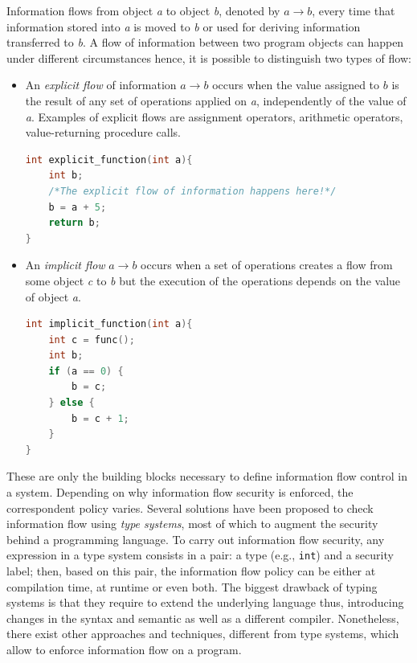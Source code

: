 \documentclass[LaM,binding=0.6cm]{sapthesis}
\begin{document}
Information flows from object \textit{a} to object \textit{b}, denoted by $a \rightarrow b$, every time that information stored into \textit{a} is moved to \textit{b} or used for deriving information transferred to \textit{b}. A flow of information between two program objects can happen under different circumstances hence, it is possible to distinguish two types of flow:
\begin{itemize}
\item An \textit{explicit flow} of information $a \rightarrow b$ occurs when the value assigned to $b$ is the result of any set of operations applied on \textit{a}, independently of the value of \textit{a}. Examples of explicit flows are assignment operators, arithmetic operators, value-returning procedure calls.
\begin{lstlisting}[language=C++, caption=Example of explicit flow where the value of variable \texttt{b} is the result of an addition operation involving variable \texttt{a}.]
int explicit_function(int a){
	int b;
	/*The explicit flow of information happens here!*/
	b = a + 5;
	return b;
}
\end{lstlisting}
\item An \textit{implicit flow} $a \rightarrow b$ occurs when a set of operations creates a flow from some object \textit{c} to \textit{b} but the execution of the operations depends on the value of object \textit{a}.
\begin{lstlisting}[language=C++, caption=Example of implicit flow where the value assumed by variable \texttt{b} depends on the actual value of variable \texttt{a}.]
int implicit_function(int a){
	int c = func();
	int b;
	if (a == 0) {
		b = c;
	} else {
		b = c + 1;
	}
}
\end{lstlisting}
\end{itemize}
These are only the building blocks necessary to define information flow control in a system. Depending on why information flow security is enforced, the correspondent policy varies. Several solutions have been proposed to check information flow using \textit{type systems}, most of which to augment the security behind a programming language\cite{malecha2010more}. To carry out information flow security, any expression in a type system consists in a pair: a type (e.g., \texttt{int}) and a security label; then, based on this pair, the information flow policy can be either at compilation time, at runtime or even both\cite{sabelfeld2003language}.
\newpage
The biggest drawback of typing systems is that they require to extend the underlying language thus, introducing changes in the syntax and semantic as well as a different compiler. Nonetheless, there exist other approaches and techniques, different from type systems, which allow to enforce information flow on a program.
\end{document}
